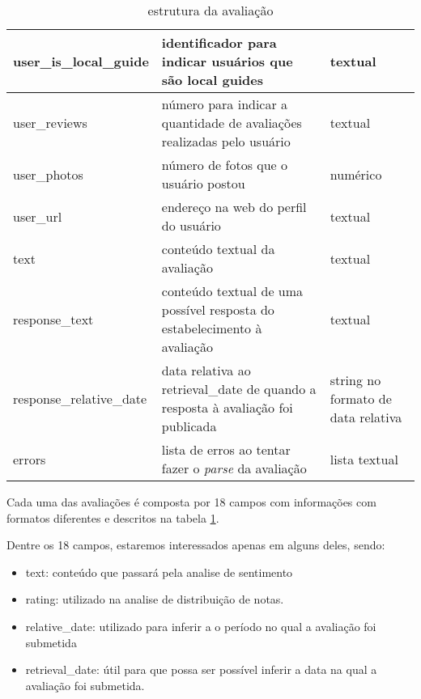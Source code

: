 \begin{table}[]
\begin{tabular}{|l|p{5cm}|p{5cm}|}
		\hline
		user\_is\_local\_guide    & identificador para indicar usuários que são local guides                        & textual                                                                        \\
		\hline
		user\_reviews             & número para indicar a quantidade de avaliações realizadas pelo usuário          & textual                                                                        \\
		\hline
		user\_photos              & número de fotos que o usuário postou                                            & numérico                                                                       \\
		\hline
		user\_url                 & endereço na web do perfil do usuário                                            & textual                                                                        \\
		\hline
		text                      & conteúdo textual da avaliação                                                   & textual                                                                        \\
		\hline
		response\_text            & conteúdo textual de uma possível resposta do estabelecimento à avaliação        & textual                                                                        \\
		\hline
		response\_relative\_date  & data relativa ao retrieval\_date de quando a resposta à avaliação foi publicada & string no formato de data relativa                                             \\
		\hline
		errors                    & lista de erros ao tentar fazer o \emph{parse} da avaliação                      & lista textual                                                                  \\
		\hline
	\end{tabular}
	\caption{estrutura da avaliação}
	\label{tab:estrutura_review}
\end{table}

Cada uma das avaliações é composta por 18 campos com informações com formatos diferentes e descritos na tabela \ref{tab:estrutura_review}.

Dentre os 18 campos, estaremos interessados apenas em alguns deles, sendo:

\begin{itemize}
	\item text: conteúdo que passará pela analise de sentimento
	\item rating: utilizado na analise de distribuição de notas.
	\item relative\_date: utilizado para inferir a o período no qual a avaliação foi submetida
	\item retrieval\_date: útil para que possa ser possível inferir a data na qual a avaliação foi submetida.
\end{itemize}

